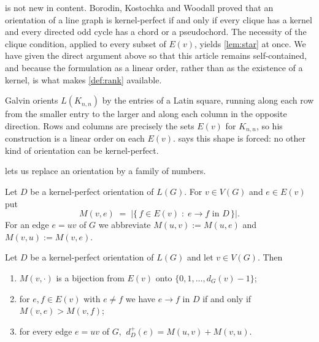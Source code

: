 \documentclass[11pt]{article}
\numberwithin{equation}{section}
\theoremstyle{plain}
\newcommand{\dip}{d^{+}}
\newcommand{\LG}{L}
\begin{document}
\begin{remark}\label{rem:bkw-clique}
 is not new in content. Borodin, Kostochka and Woodall proved that an
orientation of a line graph is kernel-perfect if and only if every clique has a kernel and
every directed odd cycle has a chord or a pseudochord. The necessity of the clique condition,
applied to every subset of $E(v)$, yields \cref{lem:star} at once. We have given the direct
argument above so that this article remains self-contained, and because the formulation as a
linear order, rather than as the existence of a kernel, is what makes
\cref{def:rank} available.
\end{remark}

\begin{remark}\label{rem:galvin-shape}
Galvin orients $\LG(K_{n,n})$ by the entries of a Latin square, running along each row from
the smaller entry to the larger and along each column in the opposite direction. Rows and
columns are precisely the sets $E(v)$ for $K_{n,n}$, so his construction is a linear order on
each $E(v)$.  says this shape is forced: no other kind of orientation can be
kernel-perfect.
\end{remark}

 lets us replace an orientation by a family of numbers.

\begin{definition}\label{def:rank}
Let $D$ be a kernel-perfect orientation of $\LG(G)$. For $v\in V(G)$ and $e\in E(v)$ put
\[
  M(v,e)\;=\;\bigl|\{\,f\in E(v)\;:\;e\to f \text{ in } D\,\}\bigr|.
\]
For an edge $e=uv$ of $G$ we abbreviate $M(u,v):=M(u,e)$ and $M(v,u):=M(v,e)$.
\end{definition}

\begin{lemma}\label{lem:rank}
Let $D$ be a kernel-perfect orientation of $\LG(G)$ and let $v\in V(G)$. Then
\begin{enumerate}[label=\textup{(\alph*)}]
  \item $M(v,\cdot)$ is a bijection from $E(v)$ onto $\{0,1,\dots,d_G(v)-1\}$;
  \item for $e,f\in E(v)$ with $e\ne f$ we have $e\to f$ in $D$ if and only if
        $M(v,e)>M(v,f)$;
  \item for every edge $e=uv$ of $G$,
        $\ \dip_D(e)=M(u,v)+M(v,u)$.
\end{enumerate}
\end{lemma}
\end{document}
